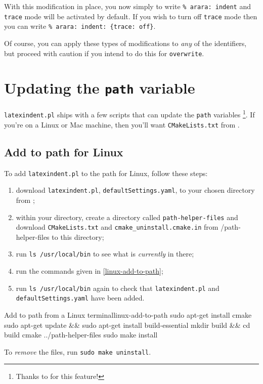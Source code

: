 \documentclass[11pt]{article}
\begin{document}
With this modification in place, you now simply to write \lstinline!% arara: indent! and
\lstinline!trace! mode will be activated by default. If you wish to turn off \lstinline!trace!
mode then you can write \lstinline!% arara: indent: {trace: off}!.

Of course, you can apply these types of modifications to \emph{any} of the identifiers,
but proceed with caution if you intend to do this for \lstinline!overwrite!.

\section{Updating the \lstinline!path! variable}\label{sec:updating-path}
\lstinline!latexindent.pl! ships with a few scripts that can update the \lstinline!path! variables
\footnote{Thanks to \cite{jasjuang} for this feature!}. If you're
on a Linux or Mac machine, then you'll want \lstinline!CMakeLists.txt! from \cite{latexindent-home}.
\subsection{Add to path for Linux}
To add \lstinline!latexindent.pl! to the path for Linux, follow these steps:
\begin{enumerate}
	\item download  \lstinline!latexindent.pl!, \lstinline!defaultSettings.yaml!,  to your
      chosen directory from \cite{latexindent-home} ; 
    \item within your directory, create a directory called \lstinline!path-helper-files! and 
      download \lstinline!CMakeLists.txt! and \lstinline!cmake_uninstall.cmake.in!
	      from \cite{latexindent-home}/path-helper-files to this directory;
	\item run \lstinline!ls /usr/local/bin! to see what is \emph{currently} in there;
	\item run the commands given in \cref{linux-add-to-path};
	\item run \lstinline!ls /usr/local/bin! again to check that \lstinline!latexindent.pl! and \lstinline!defaultSettings.yaml!
	      have been added.
\end{enumerate}
\begin{cmhlistings}[style=yaml,numbers=none]{Add to path from a Linux terminal}{linux-add-to-path}
sudo apt-get install cmake
sudo apt-get update && sudo apt-get install build-essential
mkdir build && cd build
cmake ../path-helper-files
sudo make install
\end{cmhlistings}
To \emph{remove} the files, run \lstinline!sudo make uninstall!.
\end{document}
